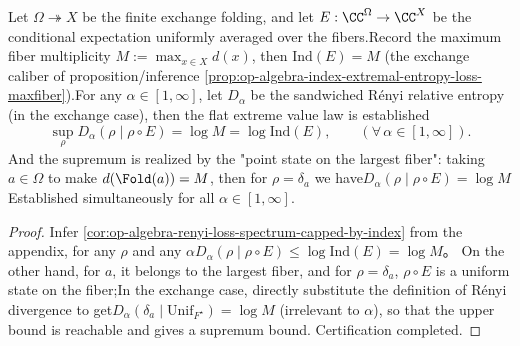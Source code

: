 \begin{corollary}\label{cor:dephys-renyi-flatness-fold-commutative}Let \(\Omega\twoheadrightarrow X\) be the finite exchange folding, and let \(E:\CC^{\Omega}\to\CC^{X}\) be the conditional expectation uniformly averaged over the fibers.Record the maximum fiber multiplicity \(M:=\max_{x\in X}d(x)\), then \(\mathrm{Ind}(E)=M\) (the exchange caliber of proposition/inference \ref{prop:op-algebra-index-extremal-entropy-loss-maxfiber}).For any \(\alpha\in[1,\infty]\), let \(D_\alpha\) be the sandwiched Rényi relative entropy (in the exchange case), then the flat extreme value law is established\[
\boxed{\;
\sup_{\rho}D_\alpha(\rho\mid\rho\circ E)=\log M=\log\mathrm{Ind}(E),\qquad(\forall\,\alpha\in[1,\infty]).\;}
\]
And the supremum is realized by the "point state on the largest fiber": taking \(a\in\Omega\) to make \(d(\Fold(a))=M\), then for \(\rho=\delta_a\) we have\(
D_\alpha(\rho\mid\rho\circ E)=\log M
\)
Established simultaneously for all \(\alpha\in[1,\infty]\).\end{corollary}

\begin{proof}
Infer \ref{cor:op-algebra-renyi-loss-spectrum-capped-by-index} from the appendix, for any \(\rho\) and any \(\alpha\)\(
D_\alpha(\rho\mid\rho\circ E)\le \log\mathrm{Ind}(E)=\log M
\)。
On the other hand, for \(a\), it belongs to the largest fiber, and for \(\rho=\delta_a\), \(\rho\circ E\) is a uniform state on the fiber;In the exchange case, directly substitute the definition of Rényi divergence to get\(
D_\alpha(\delta_a\mid \mathrm{Unif}_{F^\star})=\log M
\)
(irrelevant to \(\alpha\)), so that the upper bound is reachable and gives a supremum bound. Certification completed.\end{proof}

\endinput

